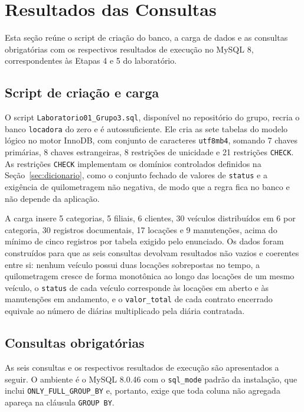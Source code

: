 \section{Resultados das Consultas}
\label{sec:consultas}

Esta se\c{c}\~ao re\'une o script de cria\c{c}\~ao do banco, a carga de dados e as consultas obrigat\'orias com os respectivos resultados de execu\c{c}\~ao no MySQL 8, correspondentes \`as Etapas 4 e 5 do laborat\'orio.

\subsection{Script de cria\c{c}\~ao e carga}

O script \texttt{Laboratorio01\_Grupo3.sql}, dispon\'{i}vel no reposit\'orio do grupo, recria o banco \texttt{locadora} do zero e \'e autossuficiente. Ele cria as sete tabelas do modelo l\'ogico no motor InnoDB, com conjunto de caracteres \texttt{utf8mb4}, somando 7 chaves prim\'arias, 8 chaves estrangeiras, 8 restri\c{c}\~oes de unicidade e 21 restri\c{c}\~oes \texttt{CHECK}. As restri\c{c}\~oes \texttt{CHECK} implementam os dom\'{i}nios controlados definidos na Se\c{c}\~ao~\ref{sec:dicionario}, como o conjunto fechado de valores de \texttt{status} e a exig\^encia de quilometragem n\~ao negativa, de modo que a regra fica no banco e n\~ao depende da aplica\c{c}\~ao.

A carga insere 5 categorias, 5 filiais, 6 clientes, 30 ve\'{i}culos distribu\'{i}dos em 6 por categoria, 30 registros documentais, 17 loca\c{c}\~oes e 9 manuten\c{c}\~oes, acima do m\'{i}nimo de cinco registros por tabela exigido pelo enunciado. Os dados foram constru\'{i}dos para que as seis consultas devolvam resultados n\~ao vazios e coerentes entre si: nenhum ve\'{i}culo possui duas loca\c{c}\~oes sobrepostas no tempo, a quilometragem cresce de forma monot\^onica ao longo das loca\c{c}\~oes de um mesmo ve\'{i}culo, o \texttt{status} de cada ve\'{i}culo corresponde \`as loca\c{c}\~oes em aberto e \`as manuten\c{c}\~oes em andamento, e o \texttt{valor\_total} de cada contrato encerrado equivale ao n\'umero de di\'arias multiplicado pela di\'aria contratada.

\subsection{Consultas obrigat\'orias}

As seis consultas e os respectivos resultados de execu\c{c}\~ao s\~ao apresentados a seguir. O ambiente \'e o MySQL 8.0.46 com o \texttt{sql\_mode} padr\~ao da instala\c{c}\~ao, que inclui \texttt{ONLY\_FULL\_GROUP\_BY} e, portanto, exige que toda coluna n\~ao agregada apare\c{c}a na cl\'ausula \texttt{GROUP BY}.

